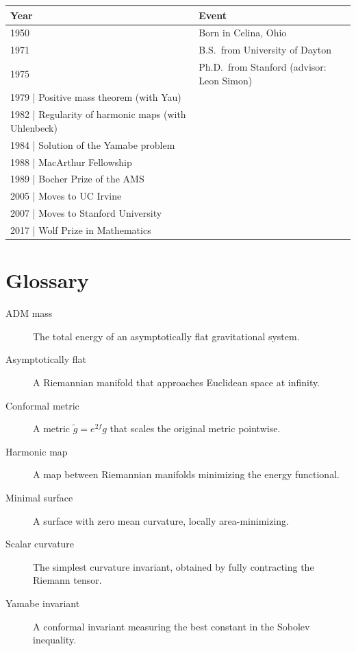 \begin{tabularx}{\linewidth}{|p{1.5cm}|>{\raggedright\arraybackslash}X|}
\hline
\textbf{Year} & \textbf{Event} \\ \hline
1950 & Born in Celina, Ohio \\ \hline
1971 & B.S.\ from University of Dayton \\ \hline
1975 & Ph.D.\ from Stanford (advisor: Leon Simon) \\ \hline
1979 | Positive mass theorem (with Yau) \\ \hline
1982 | Regularity of harmonic maps (with Uhlenbeck) \\ \hline
1984 | Solution of the Yamabe problem \\ \hline
1988 | MacArthur Fellowship \\ \hline
1989 | Bocher Prize of the AMS \\ \hline
2005 | Moves to UC Irvine \\ \hline
2007 | Moves to Stanford University \\ \hline
2017 | Wolf Prize in Mathematics \\ \hline
\end{tabularx}

\section*{Glossary}

\begin{description}
    \item[ADM mass] The total energy of an asymptotically flat gravitational system.
    \item[Asymptotically flat] A Riemannian manifold that approaches Euclidean space at infinity.
    \item[Conformal metric] A metric $\tilde g = e^{2f} g$ that scales the original metric pointwise.
    \item[Harmonic map] A map between Riemannian manifolds minimizing the energy functional.
    \item[Minimal surface] A surface with zero mean curvature, locally area-minimizing.
    \item[Scalar curvature] The simplest curvature invariant, obtained by fully contracting the Riemann tensor.
    \item[Yamabe invariant] A conformal invariant measuring the best constant in the Sobolev inequality.
\end{description}


